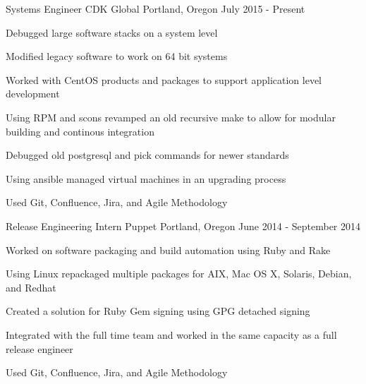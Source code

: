 

\begin{cventries}

  \cventry
    {Systems Engineer} %
    {CDK Global} %
    {Portland, Oregon} %
    {July 2015 - Present} %
    {
      \begin{cvitems} %
        \item {Debugged large software stacks on a system level}
        \item {Modified legacy software to work on 64 bit systems}
        \item {Worked with CentOS products and packages to support application level development}
        \item {Using RPM and scons revamped an old recursive make to allow for modular building and continous integration}
        \item {Debugged old postgresql and pick commands for newer standards}
        \item {Using ansible managed virtual machines in an upgrading process}
        \item {Used Git, Confluence, Jira, and Agile Methodology}
      \end{cvitems}
    }

  \cventry
    {Release Engineering Intern} %
    {Puppet} %
    {Portland, Oregon} %
    {June 2014 - September 2014} %
    {
      \begin{cvitems} %
        \item {Worked on software packaging and build automation using Ruby and Rake}
        \item {Using Linux repackaged multiple packages for AIX, Mac OS X, Solaris, Debian, and Redhat}
        \item {Created a solution for Ruby Gem signing using GPG detached signing}
        \item {Integrated with the full time team and worked in the same capacity as a full release engineer}
        \item {Used Git, Confluence, Jira, and Agile Methodology}
      \end{cvitems}
    }


\end{cventries}
